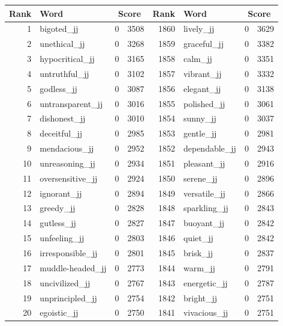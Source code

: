 \begin{table}[tbp]
    \begin{tabular}{| rlr@{.}l | rlr@{.}l |}
    \hline
    \textbf{Rank} & \textbf{Word} & \multicolumn{2}{c|}{\textbf{Score}} & \textbf{Rank} & \textbf{Word} & \multicolumn{2}{c|}{\textbf{Score}} \\
    \hline
    1 & bigoted\_jj & 0 & 3508    &    1860 & lively\_jj & 0 & 3629 \\
    2 & unethical\_jj & 0 & 3268    &    1859 & graceful\_jj & 0 & 3382 \\
    3 & hypocritical\_jj & 0 & 3165    &    1858 & calm\_jj & 0 & 3351 \\
    4 & untruthful\_jj & 0 & 3102    &    1857 & vibrant\_jj & 0 & 3332 \\
    5 & godless\_jj & 0 & 3087    &    1856 & elegant\_jj & 0 & 3138 \\
    6 & untransparent\_jj & 0 & 3016    &    1855 & polished\_jj & 0 & 3061 \\
    7 & dishonest\_jj & 0 & 3010    &    1854 & sunny\_jj & 0 & 3037 \\
    8 & deceitful\_jj & 0 & 2985    &    1853 & gentle\_jj & 0 & 2981 \\
    9 & mendacious\_jj & 0 & 2952    &    1852 & dependable\_jj & 0 & 2943 \\
    10 & unreasoning\_jj & 0 & 2934    &    1851 & pleasant\_jj & 0 & 2916 \\
    11 & oversensitive\_jj & 0 & 2924    &    1850 & serene\_jj & 0 & 2896 \\
    12 & ignorant\_jj & 0 & 2894    &    1849 & versatile\_jj & 0 & 2866 \\
    13 & greedy\_jj & 0 & 2828    &    1848 & sparkling\_jj & 0 & 2843 \\
    14 & gutless\_jj & 0 & 2827    &    1847 & buoyant\_jj & 0 & 2842 \\
    15 & unfeeling\_jj & 0 & 2803    &    1846 & quiet\_jj & 0 & 2842 \\
    16 & irresponsible\_jj & 0 & 2801    &    1845 & brisk\_jj & 0 & 2837 \\
    17 & muddle-headed\_jj & 0 & 2773    &    1844 & warm\_jj & 0 & 2791 \\
    18 & uncivilized\_jj & 0 & 2767    &    1843 & energetic\_jj & 0 & 2787 \\
    19 & unprincipled\_jj & 0 & 2754    &    1842 & bright\_jj & 0 & 2751 \\
    20 & egoistic\_jj & 0 & 2750    &    1841 & vivacious\_jj & 0 & 2751 \\

\end{tabular}
\end{table}

